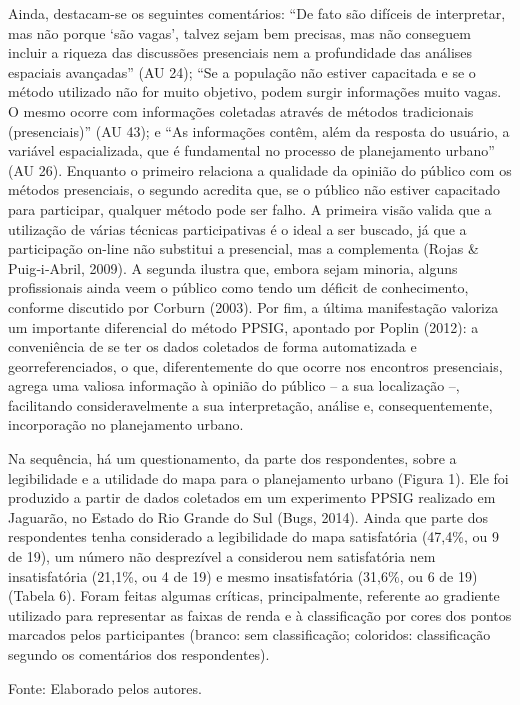 \documentclass{article}
\begin{document}
Ainda, destacam-se os seguintes comentários: “De fato são difíceis de
interpretar, mas não porque ‘são vagas’, talvez sejam bem
precisas, mas não conseguem incluir a riqueza das discussões presenciais nem
a profundidade das análises espaciais avançadas” (AU 24);
“Se a população não estiver capacitada e se o método utilizado não
for muito objetivo, podem surgir informações muito vagas. O mesmo ocorre com
informações coletadas através de métodos tradicionais
(presenciais)” (AU 43); e “As informações contêm, além da
resposta do usuário, a variável espacializada, que é fundamental no processo
de planejamento urbano” (AU 26). Enquanto o primeiro relaciona a
qualidade da opinião do público com os métodos presenciais, o segundo acredita
que, se o público não estiver capacitado para participar, qualquer método pode
ser falho. A primeira visão valida que a utilização de várias técnicas
participativas é o ideal a ser buscado, já que a participação on-line não
substitui a presencial, mas a complementa (Rojas \& Puig‐i‐Abril, 2009). A
segunda ilustra que, embora sejam
minoria, alguns profissionais ainda veem o público como tendo um déficit de
conhecimento, conforme discutido por Corburn
(2003). Por fim, a última manifestação valoriza um importante
diferencial do método PPSIG, apontado por Poplin (2012): a conveniência de se
ter os dados coletados de forma
automatizada e georreferenciados, o que, diferentemente do que ocorre nos
encontros presenciais, agrega uma valiosa informação à opinião do público – a
sua localização –, facilitando consideravelmente a sua interpretação, análise e,
consequentemente, incorporação no planejamento urbano.

Na sequência, há um questionamento, da parte dos respondentes, sobre a
legibilidade e a utilidade do mapa para o planejamento urbano (Figura 1). Ele
foi produzido a partir de
dados coletados em um experimento PPSIG realizado em Jaguarão, no Estado do Rio
Grande do Sul (Bugs, 2014). Ainda que
parte dos respondentes tenha considerado a legibilidade do mapa satisfatória
(47,4\%, ou 9 de 19), um número não desprezível a considerou nem satisfatória
nem
insatisfatória (21,1\%, ou 4 de 19) e mesmo insatisfatória (31,6\%, ou 6 de 19)
(Tabela 6). Foram feitas algumas
críticas, principalmente, referente ao gradiente utilizado para representar as
faixas de renda e à classificação por cores dos pontos marcados pelos
participantes (branco: sem classificação; coloridos: classificação segundo os
comentários dos respondentes).

Fonte: Elaborado pelos autores.
\end{document}
